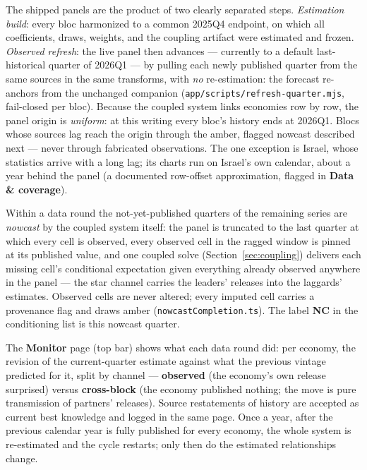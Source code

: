 \documentclass[11pt]{article}
\newcommand{\ui}[1]{\textbf{#1}}
\theoremstyle{plain}
\theoremstyle{remark}
\begin{document}
The shipped panels are the product of two clearly separated steps.
\emph{Estimation build}: every bloc harmonized to a common 2025Q4
endpoint, on which all coefficients, draws, weights, and the coupling
artifact were estimated and frozen. \emph{Observed refresh}: the live
panel then advances --- currently to a default last-historical quarter
of 2026Q1 --- by pulling each newly published quarter from the same
sources in the same transforms, with \emph{no} re-estimation: the
forecast re-anchors from the unchanged companion
(\texttt{app/scripts/refresh-quarter.mjs}, fail-closed per bloc).
Because the coupled system links economies row by row, the panel origin
is \emph{uniform}: at this writing every bloc's history ends at 2026Q1.
Blocs whose sources lag reach the origin through the amber, flagged
nowcast described next --- never through fabricated observations. The
one exception is Israel, whose statistics arrive with a long lag; its
charts run on Israel's own calendar, about a year behind the panel (a
documented row-offset approximation, flagged in
\ui{Data \& coverage}).

Within a data round the not-yet-published quarters of the remaining
series are \emph{nowcast} by the coupled system itself: the panel is
truncated to the last quarter at which every cell is observed, every
observed cell in the ragged window is pinned at its published value, and
one coupled solve (Section~\ref{sec:coupling}) delivers each missing
cell's conditional expectation given everything already observed
anywhere in the panel --- the star channel carries the leaders' releases
into the laggards' estimates. Observed cells are never altered; every
imputed cell carries a provenance flag and draws amber
(\texttt{nowcastCompletion.ts}). The label \ui{NC} in the conditioning
list is this nowcast quarter.

The \ui{Monitor} page (top bar) shows what each data round did: per
economy, the revision of the current-quarter estimate against what the
previous vintage predicted for it, split by channel ---
\ui{observed} (the economy's own release surprised) versus
\ui{cross-block} (the economy published nothing; the move is pure
transmission of partners' releases). Source restatements of history are
accepted as current best knowledge and logged in the same page.
Once a year, after the previous calendar year is fully published for
every economy, the whole system is re-estimated and the cycle restarts;
only then do the estimated relationships change.

\end{document}
